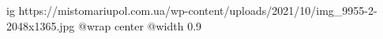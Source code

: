  
 
 
 
 

\ifcmt
  ig https://mistomariupol.com.ua/wp-content/uploads/2021/10/img_9955-2-2048x1365.jpg
  @wrap center
  @width 0.9
\fi
